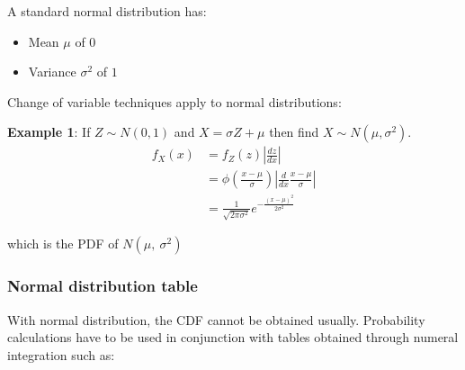 \documentclass[10pt,a4paper]{article}
\begin{document}
A standard normal distribution has:
\begin{itemize}
    \item Mean $\mu$ of $0$
    \item Variance $\sigma^2$ of $1$
\end{itemize}

Change of variable techniques apply to normal distributions:

\textbf{Example 1}: If $Z\sim N(0,1)$ and $X=\sigma Z + \mu$ then find $X \sim N(\mu, \sigma^2)$.
\begin{align*}
    f_X(x) &= f_Z(z) \left| \frac{dz}{dx}\right| \\
    &= \phi \left(\frac{x - \mu}{\sigma}\right)\left| \frac{d}{dx} \frac{x-\mu}{\sigma} \right| \\
    &= \frac{1}{\sqrt{2\pi \sigma^2}}e^{-\frac{(x-\mu)^2}{2\sigma^2}}
\end{align*}

which is the PDF of $N(\mu,\: \sigma^2)$

\subsubsection{Normal distribution table}

With normal distribution, the CDF cannot be obtained usually. Probability calculations have to be
used in conjunction with tables obtained through numeral integration such as:
\end{document}
